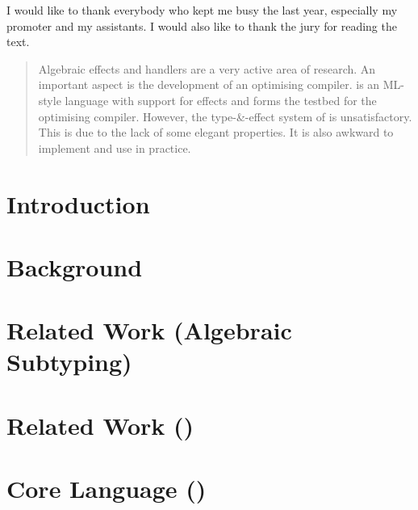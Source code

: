 \documentclass[master=cws,masteroption=ai]{kulemt}
\let\section\chapter
\begin{document}
\begin{preface}
  I would like to thank everybody who kept me busy the last year,
  especially my promoter and my assistants. I would also like to thank the
  jury for reading the text.
\end{preface}

\tableofcontents*

\begin{abstract}
  Algebraic effects and handlers are a very active area of research. An important aspect is the development of an optimising compiler. \eff is an ML-style language with support for effects and forms the testbed for the optimising compiler. However, the type-\&-effect system of \eff is unsatisfactory. This is due to the lack of some elegant properties. It is also awkward to implement and use in practice.
\end{abstract}

\listoffigures
\listoftables

\mainmatter

\section{Introduction}


\section{Background}


\section{Related Work (Algebraic Subtyping)}


\section{Related Work (\eff)}




\section{Core Language (\core)}







\end{document}
